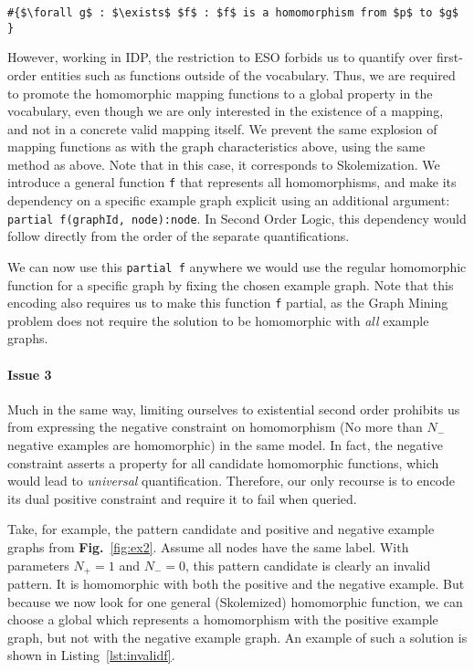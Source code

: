 \begin{lstlisting}[mathescape, caption=Quantifying over functions outside the vocabulary, label=QuantifyOutsideVocabulary,basicstyle=\fontfamily{lmvtt}\selectfont]
#{$\forall g$ : $\exists$ $f$ : $f$ is a homomorphism from $p$ to $g$ }
\end{lstlisting}
However, working in IDP, the restriction to ESO forbids us to quantify over first-order entities such as functions outside of the vocabulary.
Thus, we are required to promote the homomorphic mapping functions to a global property in the vocabulary, even though we are only interested in the existence of a mapping, and not in a concrete valid mapping itself.
We prevent the same explosion of mapping functions as with the graph characteristics above, using the same method as above. Note that in this case, it corresponds to Skolemization.
We introduce a general function \verb|f| that represents all homomorphisms, and make its dependency on a specific example graph explicit using an additional argument:
\verb|partial f(graphId, node):node|.
In Second Order Logic, this dependency would follow directly from the order of the separate quantifications.

We can now use this \verb|partial f| anywhere we would use the regular homomorphic function for a specific graph by fixing the chosen example graph.
Note that this encoding also requires us to make this function \verb|f| partial, as the Graph Mining problem does not require the solution to be homomorphic with \emph{all} example graphs.


\paragraph{Issue 3} Much in the same way, limiting ourselves to existential second order prohibits us from expressing the negative constraint on homomorphism (No more than $N_{-}$ negative examples are homomorphic) in the same model.
In fact, the negative constraint asserts a property for all candidate homomorphic functions, which would lead to \emph{universal} quantification.
Therefore, our only recourse is to encode its dual positive constraint and require it to fail when queried.

Take, for example, the pattern candidate and positive and negative example graphs from \textbf{Fig.}~\ref{fig:ex2}.
Assume all nodes have the same label.
With parameters $N_{+}=1$ and $N_{-}=0$, this pattern candidate is clearly an invalid pattern. 
It is homomorphic with both the positive and the negative example.
But because we now look for one general (Skolemized) homomorphic function, we can choose a global which represents a homomorphism with the positive example graph, but not with the negative example graph.
An example of such a solution is shown in Listing~\ref{lst:invalidf}.

